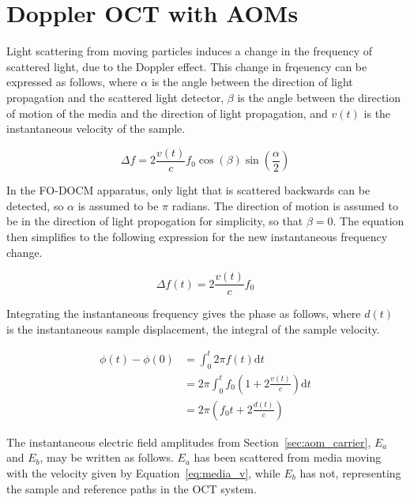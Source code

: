 \section{Doppler OCT with AOMs}
\label{sec:doppler_aom}


Light scattering from moving particles induces a change in the frequency of scattered light, due to the Doppler effect. This change in frqeuency can be expressed as follows, where $\alpha$ is the angle between the direction of light propagation and the scattered light detector, $\beta$ is the angle between the direction of motion of the media and the direction of light propagation, and $v(t)$ is the instantaneous velocity of the sample. \cite{hurst}


\begin{equation} \Delta f = 2 \frac{v(t)}{c} f_0 \cos{(\beta)} \sin{(\frac{\alpha}{2})} \end{equation}

In the FO-DOCM apparatus, only light that is scattered backwards can be detected, so $\alpha$ is assumed to be $\pi$ radians. The direction of motion is assumed to be in the direction of light propogation for simplicity, so that $\beta = 0$. The equation then simplifies to the following expression for the new instantaneous frequency change.

\begin{equation} \Delta f(t) = 2 \frac{v(t)}{c} f_0 \end{equation}

Integrating the instantaneous frequency gives the phase as follows, where $d(t)$ is the instantaneous sample displacement, the integral of the sample velocity.

\begin{align}
\phi(t) - \phi(0) & = \int_0^{t} 2 \pi f(t) \mathrm{d}t \\
& = 2 \pi \int_0^t f_0 (1 + 2 \frac{v(t)}{c}) \mathrm{d}t \\
& = 2 \pi \left( f_0 t + 2 \frac{d(t)}{c} \right)
\end{align}

The instantaneous electric field amplitudes from Section~\ref{sec:aom_carrier}, $E_a$ and $E_b$, may be written as follows. $E_a$ has been scattered from media moving with the velocity given by Equation~\ref{eq:media_v}, while $E_b$ has not, representing the sample and reference paths in the OCT system.

